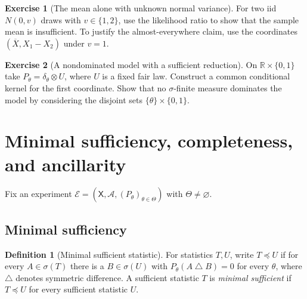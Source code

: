 \documentclass[11pt,oneside]{book}
\theoremstyle{definition}
\newtheorem{definition}[theorem]{Definition}
\newtheorem{exercise}{Exercise}[section]
\theoremstyle{remark}
\newcommand{\R}{\mathbb R}
\begin{document}
\begin{exercise}[The mean alone with unknown normal variance]
\label{exer:factorization-normal-mean-unknown-variance}
For two iid $N(0,v)$ draws with $v\in\{1,2\}$, use the
likelihood ratio to show that the sample mean is insufficient.
To justify the almost-everywhere claim, use the coordinates
$(\overline X,X_1-X_2)$ under $v=1$.
\end{exercise}

\begin{exercise}[A nondominated model with a sufficient reduction]
\label{exer:factorization-nondominated-sufficiency}
On $\R\times\{0,1\}$ take $P_\theta=\delta_\theta\otimes U$,
where $U$ is a fixed fair law. Construct a common conditional
kernel for the first coordinate. Show that no $\sigma$-finite
measure dominates the model by considering the disjoint sets
$\{\theta\}\times\{0,1\}$.
\end{exercise}



\clearpage
\section{Minimal sufficiency, completeness, and ancillarity}
\label{sec:minimal-complete-ancillary}

Fix an experiment $\mathcal E=(\mathsf X,\mathcal A,
(P_\theta)_{\theta\in\Theta})$ with $\Theta\ne\varnothing$.

\subsection{Minimal sufficiency}
\label{subsec:minimal-sufficiency}

\begin{definition}[Minimal sufficient statistic]
\label{def:minimal-sufficient-statistic}
For statistics $T,U$, write $T\preceq U$ if for every
$A\in\sigma(T)$ there is a $B\in\sigma(U)$ with
$P_\theta(A\mathbin{\triangle} B)=0$ for every $\theta$, where
$\triangle$ denotes symmetric difference. A sufficient statistic
$T$ is \emph{minimal sufficient} if $T\preceq U$ for every
sufficient statistic $U$.
\end{definition}
\end{document}
